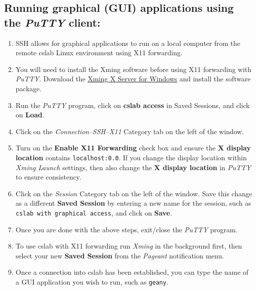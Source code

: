 \documentclass[12pt]{article}
\begin{document}
\begin{flushleft}
\subsection*{Running graphical (GUI) applications using the \textit{PuTTY} client:}
\begin{enumerate}
  \item SSH allows for graphical applications to run on a local computer from the remote cslab Linux environment using X11 forwarding.
  \item You will need to install the Xming software before using X11 forwarding with \textit{PuTTY}. Download the \href{http://sourceforge.net/project/downloading.php?group_id=156984&filename=Xming-6-9-0-31-setup.exe}{Xming X Server for Windows} and install the software package.
  \item Run the \textit{PuTTY} program, click on \textbf{cslab access} in Saved Sessions, and click on \textbf{Load}.
  \item Click on the \textit{Connection--SSH--X11} Category tab on the left of the window.
  \item Turn on the \textbf{Enable X11 Forwarding} check box and ensure the \textbf{X display location} contains \texttt{localhost:0.0}. If you change the display location within \textit{Xming Launch} settings, then also change the \textbf{X display location} in \textit{PuTTY} to ensure consistency.
  \item Click on the \textit{Session} Category tab on the left of the window. Save this change as a different \textbf{Saved Session} by entering a new name for the session, such as \texttt{cslab with graphical access}, and click on \textbf{Save}.
  \item Once you are done with the above steps, exit/close the \textit{PuTTY} program.
  \item To use cslab with X11 forwarding run \textit{Xming} in the background first, then select your new \textbf{Saved Session} from the \textit{Pageant} notification menu.
  \item Once a connection into cslab has been established, you can type the name of a GUI application you wish to run, such as \texttt{geany}.
\end{enumerate} 



\end{flushleft}
\end{document}

